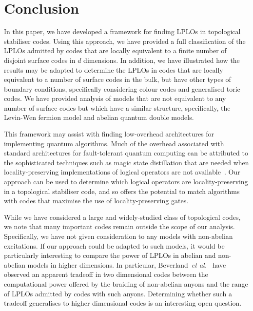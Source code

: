 \documentclass[pra,twocolumn,a4paper,nofootinbib]{revtex4-1}
\begin{document}
\section{Conclusion}

In this paper, we have developed a framework for finding LPLOs in topological stabiliser codes. Using this approach, we have provided a full classification of the LPLOs admitted by codes that are locally equivalent to a finite number of disjoint surface codes in $d$ dimensions. In addition, we have illustrated how the results may be adapted to determine the LPLOs in codes that are locally equivalent to a number of surface codes in the bulk, but have other types of boundary conditions, specifically considering colour codes and generalised toric codes.  We have provided analysis of models that are not equivalent to any number of surface codes but which have a similar structure, specifically, the Levin-Wen fermion model and abelian quantum double models.  

This framework may assist with finding low-overhead architectures for implementing quantum algorithms.  Much of the overhead associated with standard architectures for fault-tolerant quantum computing can be attributed to the sophisticated techniques such as magic state distillation that are needed when locality-preserving implementations of logical operators are not available~\cite{BraHaah, Fowleretal}.  Our approach can be used to determine which logical operators are locality-preserving in a topological stabiliser code, and so offers the potential to match algorithms with codes that maximise the use of locality-preserving gates.  

While we have considered a large and widely-studied class of topological codes, we note that many important codes remain outside the scope of our analysis. Specifically, we have not given consideration to any models with non-abelian excitations. If our approach could be adapted to such models, it would be particularly interesting to compare the power of LPLOs in abelian and non-abelian models in higher dimensions. In particular, Beverland~\textit{et al.}~\cite{Beverland} have observed an apparent tradeoff in two dimensional codes between the computational power offered by the braiding of non-abelian anyons and the range of LPLOs admitted by codes with such anyons.  Determining whether such a tradeoff generalises to higher dimensional codes is an interesting open question.
\end{document}
